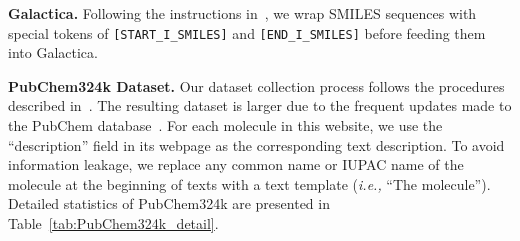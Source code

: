 \documentclass[11pt]{article}
\newcommand{\ie}{\emph{i.e., }}
\begin{document}
\textbf{Galactica.} Following the instructions in~\cite{Galactica}, we wrap SMILES sequences with special tokens of \texttt{[START\_I\_SMILES]} and \texttt{[END\_I\_SMILES]} before feeding them into Galactica. 

\textbf{PubChem324k Dataset.} Our dataset collection process follows the procedures described in~\cite{MoleculeSTM}. The resulting dataset is larger due to the frequent updates made to the PubChem database~\cite{PubChem}. For each molecule in this website, we use the ``description'' field in its webpage as the corresponding text description. To avoid information leakage, we replace any common name or IUPAC name of the molecule at the beginning of texts with a text template (\ie ``The molecule''). Detailed statistics of PubChem324k are presented in Table~\ref{tab:PubChem324k_detail}. 
\end{document}
